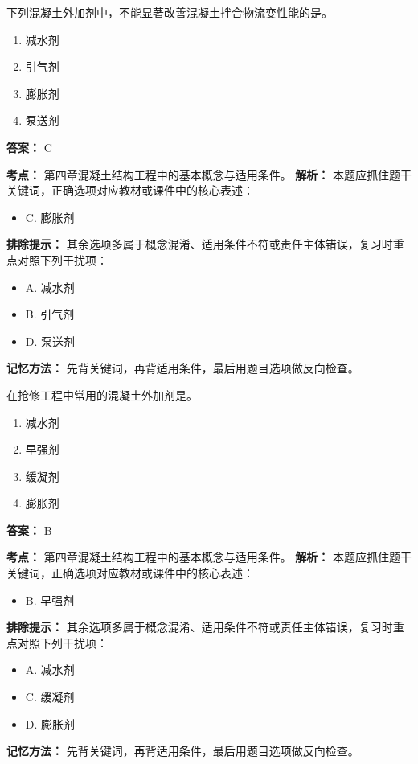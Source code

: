 \documentclass[UTF8,fontset=fandol,11pt]{ctexart}
\begin{document}
\begin{quizbox}[title={第 66 题}]
下列混凝土外加剂中，不能显著改善混凝土拌合物流变性能的是。\\
\begin{enumerate}[label=\Alph*.]
\item 减水剂
\item 引气剂
\item 膨胀剂
\item 泵送剂
\end{enumerate}
\textbf{答案：} C
\vspace{0.25em}
\begin{answerbox}[title={考点解析}]
\textbf{考点：} 第四章混凝土结构工程中的基本概念与适用条件。
\textbf{解析：} 本题应抓住题干关键词，正确选项对应教材或课件中的核心表述：
\begin{itemize}
\item C. 膨胀剂
\end{itemize}
\textbf{排除提示：} 其余选项多属于概念混淆、适用条件不符或责任主体错误，复习时重点对照下列干扰项：
\begin{itemize}
\item A. 减水剂
\item B. 引气剂
\item D. 泵送剂
\end{itemize}
\textbf{记忆方法：} 先背关键词，再背适用条件，最后用题目选项做反向检查。
\end{answerbox}
\end{quizbox}

\begin{quizbox}[title={第 67 题}]
在抢修工程中常用的混凝土外加剂是。\\
\begin{enumerate}[label=\Alph*.]
\item 减水剂
\item 早强剂
\item 缓凝剂
\item 膨胀剂
\end{enumerate}
\textbf{答案：} B
\vspace{0.25em}
\begin{answerbox}[title={考点解析}]
\textbf{考点：} 第四章混凝土结构工程中的基本概念与适用条件。
\textbf{解析：} 本题应抓住题干关键词，正确选项对应教材或课件中的核心表述：
\begin{itemize}
\item B. 早强剂
\end{itemize}
\textbf{排除提示：} 其余选项多属于概念混淆、适用条件不符或责任主体错误，复习时重点对照下列干扰项：
\begin{itemize}
\item A. 减水剂
\item C. 缓凝剂
\item D. 膨胀剂
\end{itemize}
\textbf{记忆方法：} 先背关键词，再背适用条件，最后用题目选项做反向检查。
\end{answerbox}
\end{quizbox}
\end{document}
